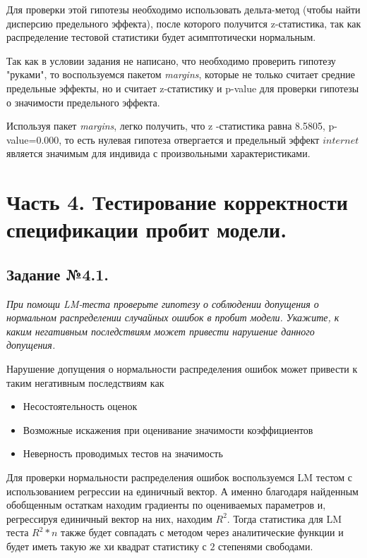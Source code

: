 \documentclass[a4paper,12pt]{article}
\begin{document}
	Для проверки этой гипотезы необходимо использовать дельта-метод (чтобы найти дисперсию предельного эффекта), после которого получится z-статистика, так как распределение тестовой статистики будет асимптотически нормальным.
	
	Так как в условии задания не написано, что необходимо проверить гипотезу "руками", то воспользуемся пакетом \textit{margins}, которые не только считает средние предельные эффекты, но и считает z-статистику и p-value для проверки гипотезы о значимости предельного эффекта.
	
	Используя пакет \textit{margins}, легко получить, что z -статистика равна 8.5805, p-value=0.000, то есть нулевая гипотеза отвергается и предельный эффект $internet$ является значимым для индивида с произвольными характеристиками.
	
	\section{Часть 4. Тестирование корректности спецификации пробит модели.}
	
	\subsection{Задание №4.1.}
	\textit{
	При помощи LM-теста проверьте гипотезу о соблюдении допущения о нормальном распределении случайных ошибок в пробит модели. Укажите, к каким негативным последствиям может привести нарушение данного допущения. }
	
	\vspace{0.2cm}
	
	Нарушение допущения о нормальности распределения ошибок может привести к таким негативным последствиям как
	
	\begin{itemize}
		\item Несостоятельность оценок 
		\item Возможные искажения при оценивание значимости коэффициентов
		\item Неверность проводимых тестов на значимость
	\end{itemize}
	
	Для проверки нормальности распределения ошибок воспользуемся LM тестом с использованием регрессии на единичный вектор. А именно благодаря найденным обобщенным остаткам находим градиенты по оцениваемых параметров и, регрессируя единичный вектор на них, находим $R^2$. Тогда статистика для LM теста $R^2*n$ также будет совпадать с методом через аналитические функции и будет иметь такую же хи квадрат статистику с $2$ степенями свободами.
	
\end{document}

